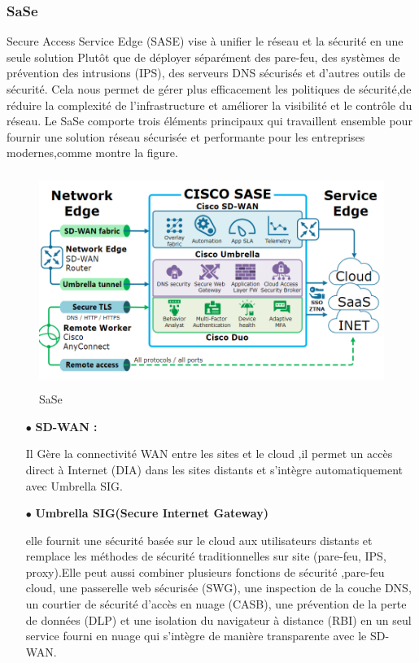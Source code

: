 \subsubsection{SaSe }
Secure Access Service Edge (SASE) vise à unifier le réseau et la sécurité en une seule solution
Plutôt que de déployer séparément des pare-feu, des systèmes de prévention des intrusions (IPS), des serveurs DNS sécurisés et d'autres outils de sécurité. Cela nous permet de gérer  plus efficacement les politiques de sécurité,de réduire la complexité de l'infrastructure et améliorer la visibilité et le contrôle du réseau.
Le SaSe comporte trois éléments principaux qui travaillent ensemble pour fournir une solution réseau sécurisée et performante pour les entreprises modernes,comme montre la figure. 
\begin{figure} [H]
	\begin{center}
		\centering
		\hspace*{-0.5cm}
		\includegraphics[height=7cm,width=14cm]{../image/sas}
	\end{center}
	\caption{SaSe}
\end{figure} 
\begin{itemize}
	\item[$\bullet$]\textbf{  SD-WAN :} 
	
	Il Gère la connectivité WAN entre les sites et le cloud ,il permet un accès direct à Internet (DIA) dans les sites distants et s'intègre automatiquement avec Umbrella SIG.
\end{itemize}
\begin{itemize}
	\item[$\bullet$]\textbf{ Umbrella SIG(Secure Internet Gateway)  } 
	
	elle fournit une sécurité basée sur le cloud aux utilisateurs distants et remplace les méthodes de sécurité traditionnelles sur site (pare-feu, IPS, proxy).Elle peut aussi combiner plusieurs fonctions de sécurité ,pare-feu cloud, une passerelle web sécurisée (SWG), une inspection de la couche DNS, un courtier de sécurité d'accès en nuage (CASB), une prévention de la perte de données (DLP) et une isolation du navigateur à distance (RBI) en un seul service fourni en nuage qui s'intègre de manière transparente avec le SD-WAN.
\end{itemize}
